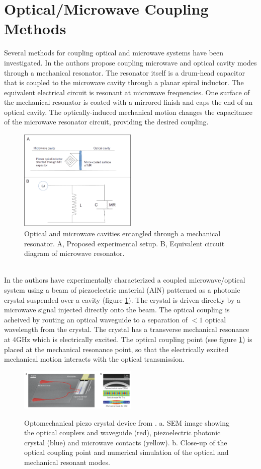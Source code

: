 \documentclass[a4paper,11pt, twocolumn]{article}
\numberwithin{equation}{section}
\begin{document}
\section{Optical/Microwave Coupling Methods}
Several methods for coupling optical and microwave systems have been investigated. 
In \cite{nanoMR} the authors propose coupling microwave and optical cavity modes through a mechanical resonator.
The resonator itself is a drum-head capacitor that is coupled to the microwave cavity through a planar spiral inductor. 
The equivalent electrical circuit is resonant at microwave frequencies.
One surface of the mechanical resonator is coated with a mirrored finish and caps the end of an optical cavity.
The optically-induced mechanical motion changes the capacitance of the microwave resonator circuit, providing the desired coupling.
\begin{figure}
 \caption{Optical and microwave cavities entangled through a mechanical resonator. A, Proposed experimental setup. B, Equivalent circuit diagram of microwave resonator.}
 \centering
   \includegraphics[width=0.5\textwidth]{figs/f1}
\end{figure}
\\In \cite{nanoCrystal} the authors have experimentally characterized a coupled microwave/optical system using a beam of piezoelectric material (AlN) patterned as a photonic crystal suspended over a cavity (figure \ref{fig:optoCrystal}).
The crystal is driven directly by a microwave signal injected directly onto the beam. 
The optical coupling is acheived by routing an optical waveguide to a separation of $<1$ optical wavelength from the crystal.
The crystal has a transverse mechanical resonance at 4GHz which is electrically excited.
The optical coupling point (see figure \ref{fig:optoCrystal}) is placed at the mechanical resonance point, so that the electrically excited mechanical motion interacts with the optical transmission.
\begin{figure}
 \caption{Optomechanical piezo crystal device from \cite{nanoCrystal}. a. SEM image showing the optical couplers and waveguide (red), piezoelectric photonic crystal (blue) and microwave contacts (yellow). b. Close-up of the optical coupling point and numerical simulation of the optical and mechanical resonant modes.}
 \centering
   \includegraphics[width=0.5\textwidth]{figs/OptoMechCrystal}
 \label{fig:optoCrystal}
\end{figure}
\end{document}

